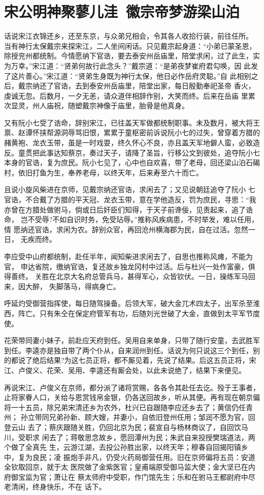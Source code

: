 \chapter{宋公明神聚蓼儿洼~徽宗帝梦游梁山泊}

话说宋江衣锦还乡，还至东京，与众弟兄相会，令其各人收拾行装，前往任所。
当有神行太保戴宗来探宋江，二人坐间闲话。只见戴宗起身道：“小弟已蒙圣恩，
除授兖州都统制。今情愿纳下官诰，要去泰安州岳庙里，陪堂求闲，过了此生，实
为万幸。”宋江道：“贤弟何故行此念头？”戴宗道：“是弟夜梦崔府君勾唤，因
此发了这片善心。”宋江道：“贤弟生身既为神行太保，他日必作岳府灵聪。”自
此相别之后，戴宗纳还了官诰，去到泰安州岳庙里，陪堂出家，每日殷勤奉祀圣帝
香火，虔诚无忽。后数月，一夕无恙，请众道伴相辞作别，大笑而终。后来在岳庙
里累次显灵，州人庙祝，随塑戴宗神像于庙里，胎骨是他真身。

又有阮小七受了诰命，辞别宋江，已往盖天军做都统制职事。未及数月，被大将王
禀、赵谭怀挟帮源洞辱骂旧恨，累累于童枢密前诉说阮小七的过失，曾穿着方腊的
赭黄袍、龙衣玉带，虽是一时戏耍，终久怀心不良，亦且盖天军地僻人蛮，必致造
反。童贯把此事达知蔡京，奏过天子，请降了圣旨，行移公文到彼处，追夺阮小七
本身的官诰，复为庶民。阮小七见了，心中也自欢喜，带了老母，回还梁山泊石碣
村，依旧打鱼为生，奉养老母，以终天年，后来寿至六十而亡。

且说小旋风柴进在京师，见戴宗纳还官诰，求闲去了；又见说朝廷追夺了阮小
七官诰，不合戴了方腊的平天冠、龙衣玉带，意在学他造反，罚为庶民，寻思：“我
亦曾在方腊处做驸马，倘或日后奸臣们知得，于天子前谗佞，见责起来，追了诰命，
岂不受辱?不如自识时务，免受玷辱。”推称风疾病患，不时举发，难以任用，情
愿纳还官诰，求闲为农。辞别众官，再回沧州横海郡为民，自在过活。忽然一日，
无疾而终。

李应受中山府都统制，赴任半年，闻知柴进求闲去了，自思也推称风瘫，不能为官，
申达省院，缴纳官诰，复还故乡独龙冈村中过活。后与杜兴一处作富豪，俱得善终。
关胜在北京大名府总管兵马，甚得军心，众皆钦伏。一日，操练军马回来，因大醉，
失脚落马，得病身亡。

呼延灼受御营指挥使，每日随驾操备。后领大军，破大金兀术四太子，出军杀至淮
西，阵亡。只有朱仝在保定府管军有功，后随刘光世破了大金，直做到太平军节度
使。

花荣带同妻小妹子，前赴应天府到任。吴用自来单身，只带了随行安童，去武胜军
到任。李逵亦是独自带了两个仆从，自来润州到任。话说为何只说这三个到任，别
的都说了绝后结果?为这七员正将，都不厮见着，先说了结果。后这五员正将，宋
江、卢俊义、花荣、吴用、李逵还有厮会处，以此未说绝了，结果下来便见。

再说宋江、卢俊义在京师，都分派了诸将赏赐，各各令其赴任去讫。殁于王事者，
止将家眷人口，关给与恩赏钱帛金银，仍各送回故乡，听从其便。再有现在朝京偏
将一十五员，除兄弟宋清还乡为农外，杜兴已自跟随李应还乡去了；黄信仍任青州；
孙立带同兄弟孙新、顾大嫂，并妻小，自依旧登州任用；邹润不愿为官，回登云山
去了；蔡庆跟随关胜，仍回北京为民；裴宣自与杨林商议了，自回饮马川，受职求
闲去了；蒋敬思念故乡，愿回潭州为民；朱武自来投授樊瑞道法，两个做了全真先
生，云游江湖，去投公孙胜出家，以终天年；穆春自回揭阳镇乡中，复为良民；凌
振炮手非凡，仍受火药局御营任用。旧在京师偏将五员：安道全钦取回京，就于太
医院做了金紫医官；皇甫端原受御马监大使；金大坚已在内府御宝监为官；萧让在
蔡太师府中受职，作门馆先生；乐和在驸马王都尉府中尽老清闲，终身快乐，不在
话下。

